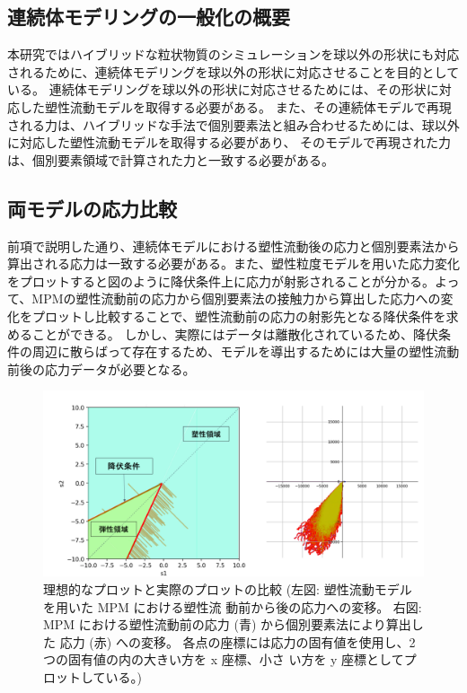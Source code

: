 \documentclass[12pt]{ltjsarticle}
\begin{document}
\subsection{連続体モデリングの一般化の概要}
本研究ではハイブリッドな粒状物質のシミュレーションを球以外の形状にも対応されるために、連続体モデリングを球以外の形状に対応させることを目的としている。
連続体モデリングを球以外の形状に対応させるためには、その形状に対応した塑性流動モデルを取得する必要がある。
また、その連続体モデルで再現される力は、ハイブリッドな手法で個別要素法と組み合わせるためには、球以外に対応した塑性流動モデルを取得する必要があり、
そのモデルで再現された力は、個別要素領域で計算された力と一致する必要がある。

\subsection{両モデルの応力比較}
前項で説明した通り、連続体モデルにおける塑性流動後の応力と個別要素法から算出される応力は一致する必要がある。また、塑性粒度モデルを用いた応力変化をプロットすると図のように降伏条件上に応力が射影されることが分かる。よって、MPMの塑性流動前の応力から個別要素法の接触力から算出した応力への変化をプロットし比較することで、塑性流動前の応力の射影先となる降伏条件を求めることができる。
しかし、実際にはデータは離散化されているため、降伏条件の周辺に散らばって存在するため、モデルを導出するためには大量の塑性流動前後の応力データが必要となる。
\begin{figure}[htbp]
  \begin{center}
  \includegraphics*{compare_stress_plot.png}
  \end{center}
\caption{理想的なプロットと実際のプロットの比較 (左図: 塑性流動モデルを用いた MPM における塑性流
動前から後の応力への変移。 右図: MPM における塑性流動前の応力 (青) から個別要素法により算出した
応力 (赤) への変移。 各点の座標には応力の固有値を使用し、2 つの固有値の内の大きい方を x 座標、小さ
い方を y 座標としてプロットしている。)}
\end{figure}
\end{document}
